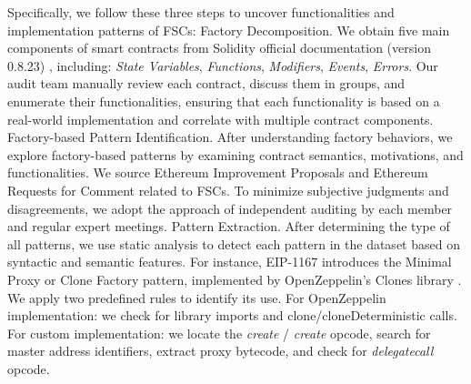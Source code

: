 \documentclass[acmsmall,screen]{acmart}
\begin{document}
	Specifically, we follow these three steps to uncover functionalities and implementation patterns of FSCs:
	 Factory Decomposition.
	We obtain five main components of smart contracts from Solidity official documentation (version 0.8.23) \cite{soliditydoc}, including: \textit{State Variables}, \textit{Functions}, \textit{Modifiers},\textit{ Events}, \textit{Errors}. Our audit team manually review each contract, discuss them in groups, and enumerate their functionalities, ensuring that each functionality is based on a real-world implementation and correlate with multiple contract components.  Factory-based Pattern Identification.
	After understanding factory behaviors, we explore factory-based patterns by examining contract semantics, motivations, and functionalities. We source Ethereum Improvement Proposals and Ethereum Requests for Comment related to FSCs. To minimize subjective judgments and disagreements, we adopt the approach of independent auditing by each member and regular expert meetings.  Pattern Extraction.\label{sec:patternextra} After determining the type of all patterns, we use static analysis to detect each pattern in the dataset based on syntactic and semantic features. For instance, EIP-1167 \cite{eip-1167} introduces the Minimal Proxy or Clone Factory pattern, implemented by OpenZeppelin’s Clones library \cite{openz-clones}. We apply two predefined rules to identify its use. For OpenZeppelin implementation: we check for library imports and clone/cloneDeterministic calls. For custom implementation: we locate the \textit{create} / \textit{create} opcode, search for master address identifiers, extract proxy bytecode, and check for \textit{delegatecall} opcode.
\end{document}
